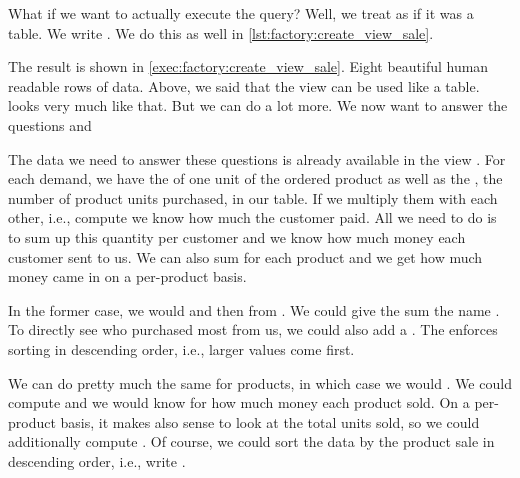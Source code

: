 What if we want to actually execute the query?
Well, we treat  as if it was a table.
We write .
We do this as well in \cref{lst:factory:create_view_sale}.

The result is shown in \cref{exec:factory:create_view_sale}.
Eight beautiful human readable rows of data.%
%
\FloatBarrier%
\endhsection%
%
%
%
%
%
Above, we said that the view  can be used like a table.
 looks very much like that.
But we can do a lot more.
We now want to answer the questions  and 

The data we need to answer these questions is already available in the view .
For each demand, we have the  of one unit of the ordered product as well as the , the number of product units purchased, in our table.
If we multiply them with each other, i.e., compute  we know how much the customer paid.
All we need to do is to sum up this quantity per customer and we know how much money each customer sent to us.
We can also sum  for each product and we get how much money came in on a per-product basis.%
%
\begin{sloppypar}%
In the former case, we would  and then  from .
We could give the sum the name .
To directly see who purchased most from us, we could also add a .
The  enforces sorting in descending order, i.e., larger values come first.%
\end{sloppypar}%
%
We can do pretty much the same for products, in which case we would .
We could compute  and we would know for how much money each product sold.
On a per-product basis, it makes also sense to look at the total units sold, so we could additionally compute .
Of course, we could sort the data by the product sale in descending order, i.e., write .

